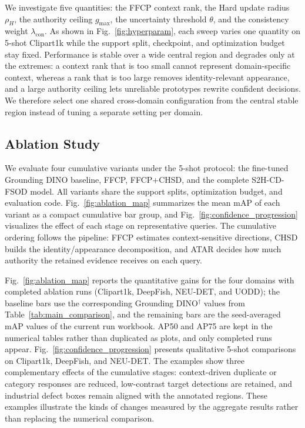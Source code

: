 

We investigate five quantities: the FFCP context rank, the Hard update radius
$\rho_H$, the authority ceiling $g_{\max}$, the uncertainty threshold $\theta$,
and the consistency weight $\lambda_{\mathrm{con}}$. As shown in
Fig.~\ref{fig:hyperparam}, each sweep varies one quantity on 5-shot Clipart1k
while the support split, checkpoint, and optimization budget stay fixed.
Performance is stable over a wide central region and degrades only at the
extremes: a context rank that is too small cannot represent domain-specific
context, whereas a rank that is too large removes identity-relevant appearance,
and a large authority ceiling lets unreliable prototypes rewrite confident
decisions. We therefore select one shared cross-domain configuration from the
central stable region instead of tuning a separate setting per domain.

\subsection{Ablation Study}
\label{sec:ablation}




We evaluate four cumulative variants under the 5-shot protocol: the fine-tuned
Grounding DINO baseline, FFCP, FFCP+CHSD, and the complete S2H-CD-FSOD model.
All variants share the support splits, optimization budget, and evaluation
code. Fig.~\ref{fig:ablation_map} summarizes the mean mAP of each variant as a
compact cumulative bar group, and Fig.~\ref{fig:confidence_progression}
visualizes the effect of each stage on representative queries. The cumulative
ordering follows the pipeline: FFCP estimates context-sensitive directions,
CHSD builds the identity/appearance decomposition, and ATAR decides how much
authority the retained evidence receives on each query.

Fig.~\ref{fig:ablation_map} reports the quantitative gains for the four
domains with completed ablation runs (Clipart1k, DeepFish, NEU-DET, and UODD);
the baseline bars use the corresponding Grounding DINO$^\dagger$ values from
Table~\ref{tab:main_comparison}, and the remaining bars are the seed-averaged
mAP values of the current run workbook.
AP50 and AP75 are kept in the numerical tables rather than duplicated as plots,
and only completed runs appear.
Fig.~\ref{fig:confidence_progression} presents
qualitative 5-shot comparisons on Clipart1k, DeepFish, and NEU-DET. The
examples show three complementary effects of the cumulative stages:
context-driven duplicate or category responses are reduced, low-contrast target
detections are retained, and industrial defect boxes remain aligned with the
annotated regions. These examples illustrate the kinds of changes measured by
the aggregate results rather than replacing the numerical comparison.

